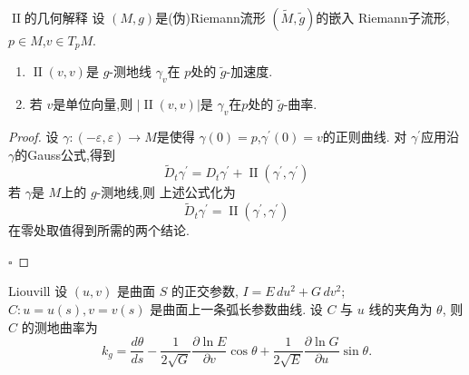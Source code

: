 \documentclass[../../main.tex]{subfiles}
\begin{document}
\begin{proposition}{\(  \operatorname{II}  \)的几何解释}
    设 \(  \left( M,g \right)   \)是(伪)Riemann流形 \(  \left( \tilde{M},\tilde{g}  \right)   \)的嵌入 Riemann子流形, \(  p \in M  \),\(  v\in T_{p}M  \).    
    \begin{enumerate}
        \item \(  \operatorname{II}\left( v,v \right)   \)是 \(  g  \)-测地线 \(   \gamma _v   \)在 \(  p  \)处的 \(  \tilde{g}   \)-加速度.
        \item 若 \(  v  \)是单位向量,则 \(  \left| \operatorname{II}\left( v,v \right)  \right|   \)是 \(   \gamma _v   \)在\(  p  \)处的 \(  \tilde{g}  \)-曲率.          
    \end{enumerate}
    
\end{proposition}
\begin{proof}
    设 \(   \gamma :\left( - \varepsilon , \varepsilon  \right)   \to M\)是使得 \(   \gamma \left( 0 \right)= p   \),\(   \gamma ^{\prime} \left( 0 \right)= v   \)的正则曲线.   对 \(   \gamma ^{\prime}   \)应用沿 \(   \gamma   \)的Gauss公式,得到 \[
    \tilde{D}_{t}  \gamma ^{\prime} = D_{t} \gamma ^{\prime} + \operatorname{II}\left(  \gamma ^{\prime} , \gamma ^{\prime}  \right) 
    \]若 \(   \gamma   \)是 \(  M  \)上的 \(  g  \)-测地线,则 上述公式化为 \[
    \tilde{D}_{t} \gamma ^{\prime} = \operatorname{II}\left(  \gamma ^{\prime} , \gamma ^{\prime}  \right) 
    \]在零处取值得到所需的两个结论.     

    \hfill $\square$
\end{proof}

\begin{theorem}{Liouvill}
    设 $(u, v)$ 是曲面 $S$ 的正交参数, $I = E\,du^2 + G\,dv^2$; $C: u = u(s), v = v(s)$ 是曲面上一条弧长参数曲线. 设 $C$ 与 $u$ 线的夹角为 $\theta$, 则 $C$ 的测地曲率为
$$
k_g = \frac{d\theta}{ds} - \frac{1}{2\sqrt{G}} \frac{\partial \ln E}{\partial v} \cos\theta + \frac{1}{2\sqrt{E}} \frac{\partial \ln G}{\partial u} \sin\theta.
$$
\end{theorem}
\end{document}
